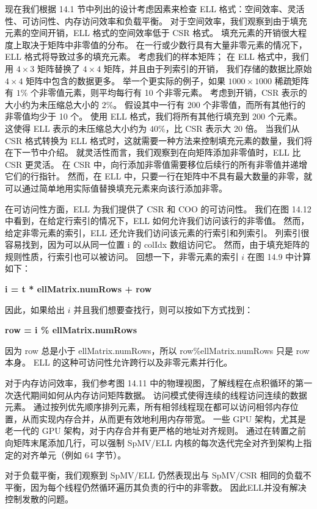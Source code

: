 现在我们根据 14.1 节中列出的设计考虑因素来检查 ELL 格式：空间效率、灵活性、可访问性、内存访问效率和负载平衡。 
对于空间效率，我们观察到由于填充元素的空间开销，ELL 格式的空间效率低于 CSR 格式。 
填充元素的开销很大程度上取决于矩阵中非零值的分布。 在一行或少数行具有大量非零元素的情况下，ELL 格式将导致过多的填充元素。 
考虑我们的样本矩阵； 在 ELL 格式中，我们用 $4 \times 3$ 矩阵替换了 $4 \times 4$ 矩阵，并且由于列索引的开销，
我们存储的数据比原始 $4 \times 4$ 矩阵中包含的数据更多。 
举一个更实际的例子，如果 $1000 \times 1000$ 稀疏矩阵有 $1 \%$ 个非零值元素，则平均每行有 10 个非零元素。 
考虑到开销，CSR 表示的大小约为未压缩总大小的 $2 \%$。 假设其中一行有 200 个非零值，而所有其他行的非零值均少于 10 个。
使用 ELL 格式，我们将所有其他行填充到 200 个元素。 这使得 ELL 表示的未压缩总大小约为 $40 \%$，比 CSR 表示大 20 倍。 
当我们从 CSR 格式转换为 ELL 格式时，这就需要一种方法来控制填充元素的数量，我们将在下一节中介绍。 
就灵活性而言，我们观察到在向矩阵添加非零值时，ELL 比 CSR 更灵活。 
在 CSR 中，向行添加非零值需要移位后续行的所有非零值并递增它们的行指针。 
然而，在 ELL 中，只要一行在矩阵中不具有最大数量的非零，就可以通过简单地用实际值替换填充元素来向该行添加非零。

在可访问性方面，ELL 为我们提供了 CSR 和 COO 的可访问性。 
我们在图 14.12 中看到，在给定行索引的情况下，ELL 如何允许我们访问该行的非零值。 
然而，给定非零元素的索引，ELL 还允许我们访问该元素的行索引和列索引。 
列索引很容易找到，因为可以从同一位置 i 的 colIdx 数组访问它。 
然而，由于填充矩阵的规则性质，行索引也可以被访问。 回想一下，非零元素的索引 $i$ 在图 14.9 中计算如下：

\textbf{i = t * ellMatrix.numRows + row}

因此，如果给出 $i$ 并且我们想要查找行，则可以按如下方式找到：

\textbf{row = i \% ellMatrix.numRows}

因为 row 总是小于 ellMatrix.numRows，所以 row\%ellMatrix.numRows 只是 row 本身。 
ELL 的这种可访问性允许跨行以及非零元素并行化。

对于内存访问效率，我们参考图 14.11 中的物理视图，了解线程在点积循环的第一次迭代期间如何从内存访问矩阵数据。 
访问模式使得连续的线程访问连续的数据元素。 
通过按列优先顺序排列元素，所有相邻线程现在都可以访问相邻内存位置，从而实现内存合并，从而更有效地利用内存带宽。 
一些 GPU 架构，尤其是老一代的 GPU 架构，对于内存合并有更严格的地址对齐规则。 
通过在转置之前向矩阵末尾添加几行，可以强制 SpMV/ELL 内核的每次迭代完全对齐到架构上指定的对齐单元（例如 64 字节）。

对于负载平衡，我们观察到 SpMV/ELL 仍然表现出与 SpMV/CSR 相同的负载不平衡，因为每个线程仍然循环遍历其负责的行中的非零数。 
因此ELL并没有解决控制发散的问题。

